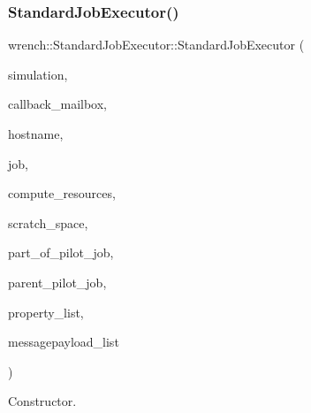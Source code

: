 \subsubsection{\texorpdfstring{Standard\+Job\+Executor()}{StandardJobExecutor()}}
{\footnotesize\ttfamily wrench\+::\+Standard\+Job\+Executor\+::\+Standard\+Job\+Executor (\begin{DoxyParamCaption}\item[{\hyperlink{classwrench_1_1_simulation}{Simulation} $\ast$}]{simulation,  }\item[{std\+::string}]{callback\+\_\+mailbox,  }\item[{std\+::string}]{hostname,  }\item[{\hyperlink{classwrench_1_1_standard_job}{Standard\+Job} $\ast$}]{job,  }\item[{std\+::map$<$ std\+::string, std\+::tuple$<$ unsigned long, double $>$$>$}]{compute\+\_\+resources,  }\item[{\hyperlink{classwrench_1_1_storage_service}{Storage\+Service} $\ast$}]{scratch\+\_\+space,  }\item[{bool}]{part\+\_\+of\+\_\+pilot\+\_\+job,  }\item[{\hyperlink{classwrench_1_1_pilot_job}{Pilot\+Job} $\ast$}]{parent\+\_\+pilot\+\_\+job,  }\item[{std\+::map$<$ std\+::string, std\+::string $>$}]{property\+\_\+list,  }\item[{std\+::map$<$ std\+::string, std\+::string $>$}]{messagepayload\+\_\+list }\end{DoxyParamCaption})}



Constructor. 


